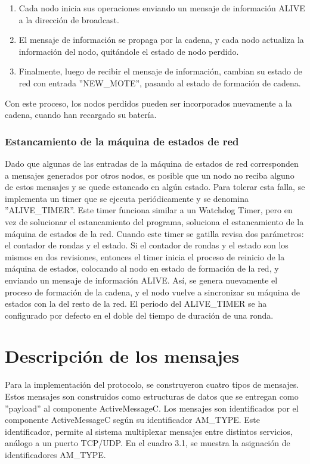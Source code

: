 \begin{enumerate}
\item Cada nodo inicia sus operaciones enviando un mensaje de información ALIVE a la dirección de broadcast.

\item El mensaje de información se propaga por la cadena, y cada nodo actualiza la información del nodo, quitándole el estado de nodo perdido.

\item Finalmente, luego de recibir el mensaje de información, cambian su estado de red con entrada ''NEW\_MOTE'', pasando al estado de formación de cadena.
\end{enumerate}

Con este proceso, los nodos perdidos pueden ser incorporados nuevamente a la cadena, cuando han recargado su batería.

\subsubsection{Estancamiento de la máquina de estados de red}
Dado que algunas de las entradas de la máquina de estados de red corresponden a mensajes generados por otros nodos, es posible que un nodo no reciba alguno de estos mensajes y se quede estancado en algún estado. Para tolerar esta falla, se implementa un timer que se ejecuta periódicamente y se denomina ''ALIVE\_TIMER''. Este timer funciona similar a un Watchdog Timer, pero en vez de solucionar el estancamiento del programa, soluciona el estancamiento de la máquina de estados de la red. Cuando este timer se gatilla revisa dos parámetros: el contador de rondas y el estado. Si el contador de rondas y el estado son los mismos en dos revisiones, entonces el timer inicia el proceso de reinicio de la máquina de estados, colocando al nodo en estado de formación de la red, y enviando un mensaje de información ALIVE. Así, se genera nuevamente el proceso de formación de la cadena, y el nodo vuelve a sincronizar su máquina de estados con la del resto de la red. El periodo del ALIVE\_TIMER se ha configurado por defecto en el doble del tiempo de duración de una ronda.

\section{Descripción de los mensajes}
Para la implementación del protocolo, se construyeron cuatro tipos de mensajes. Estos mensajes son construidos como estructuras de datos que se entregan como ''payload'' al componente ActiveMessageC.  Los mensajes son identificados por el componente ActiveMessageC según su identificador AM\_TYPE. Este identificador, permite al sistema multiplexar mensajes entre distintos servicios, análogo a un puerto TCP/UDP. En el cuadro 3.1, se muestra la asignación de identificadores AM\_TYPE.

